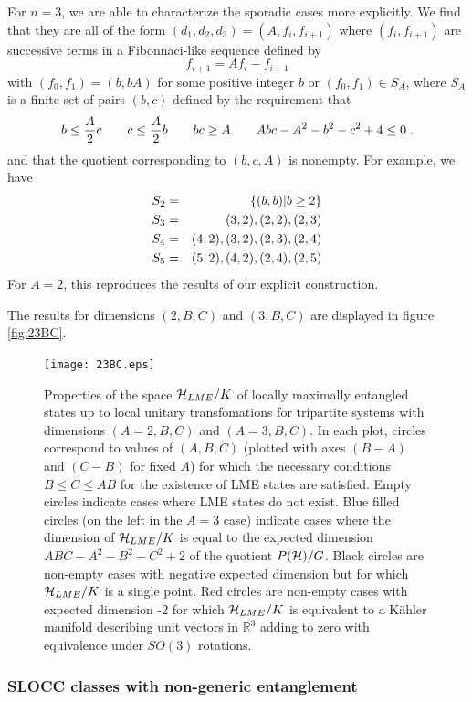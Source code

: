 \documentclass[12pt]{article}
\theoremstyle{definition}
\newcommand{\be}{\begin{equation}}
\newcommand{\ee}{\end{equation}}
\newcommand{\bea}{\begin{eqnarray}}
\newcommand{\eea}{\end{eqnarray}}
\begin{document}
For $n=3$, we are able to characterize the sporadic cases more explicitly. We find that they are all of the form $(d_1,d_2,d_3) = (A, f_i, f_{i+1})$ where $(f_i,f_{i+1})$ are successive terms in a Fibonnaci-like sequence defined by
\be
\label{Fib}
f_{i+1} = A f_i - f_{i-1}
\ee
with $(f_0,f_1) = (b,bA)$ for some positive integer $b$ or $(f_0,f_1) \in S_A$, where $S_A$ is a finite set of pairs $(b,c)$ defined by the requirement that
\be
\label{Sregion}
 b \le  {A \over 2} c \qquad  c \le {A \over 2} b  \qquad bc \ge A \qquad Abc - A^2 - b^2 - c^2 + 4 \le 0  \; .
\ee
and that the quotient corresponding to $(b,c,A)$ is nonempty. For example, we have
\bea
S_2 &=& \{(b,b)|b \ge 2\} \cr
S_3 &=& {(3,2),(2,2),(2,3)} \cr
S_4 &=& {(4,2),(3,2),(2,3),(2,4)} \cr
S_5 &=& {(5,2),(4,2),(2,4),(2,5)}
\eea
For $A=2$, this reproduces the results of our explicit construction.

The results for dimensions $(2,B,C)$ and $(3,B,C)$ are displayed in figure \ref{fig:23BC}.

\begin{figure}
\centering
\texttt{[image: 23BC.eps]}
\caption{Properties of the space ${\cal H}_{LME}/K$ of locally maximally entangled states up to local unitary transfomations for tripartite systems with dimensions $(A=2,B,C)$ and $(A=3,B,C)$. In each plot, circles correspond to values of $(A,B,C)$ (plotted with axes $(B-A)$ and $(C-B)$ for fixed $A$) for which the necessary conditions $B \le C \le AB$ for the existence of LME states are satisfied. Empty circles indicate cases where LME states do not exist. Blue filled circles (on the left in the $A=3$ case) indicate cases where the dimension of ${\cal H}_{LME}/K$ is equal to the expected dimension $ABC - A^2 - B^2 - C^2 + 2$ of the quotient $P({\cal H})/G$. Black circles are non-empty cases with negative expected dimension but for which ${\cal H}_{LME}/K$ is a single point. Red circles are non-empty cases with expected dimension -2 for which ${\cal H}_{LME}/K$ is equivalent to a K\"ahler manifold describing unit vectors in $\mathbb{R}^3$ adding to zero with equivalence under $SO(3)$ rotations.}
\label{fig:cone}
\end{figure}

\subsubsection*{SLOCC classes with non-generic entanglement}
\end{document}
